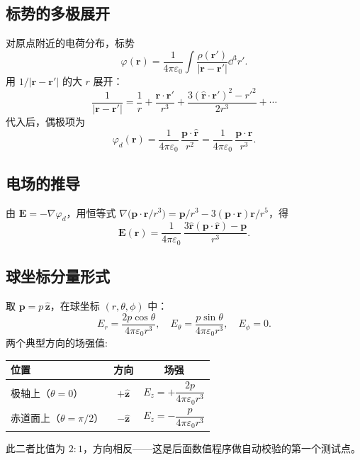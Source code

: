 \documentclass[11pt,a4paper]{article}
\newcommand{\epso}{\varepsilon_{0}}
\newcommand{\rhat}{\hat{\bm r}}
\newcommand{\pvec}{\bm p}
\newcommand{\Evec}{\bm E}
\newcommand{\rvec}{\bm r}
\begin{document}
\subsection{标势的多极展开}
对原点附近的电荷分布，标势
\begin{equation}
    \varphi(\rvec) = \frac{1}{4\pi\epso}\int\frac{\rho(\rvec')}{|\rvec-\rvec'|}\dd^{3}r'.
\end{equation}
用 $1/|\rvec-\rvec'|$ 的大 $r$ 展开：
\begin{equation}
    \frac{1}{|\rvec-\rvec'|} = \frac{1}{r} + \frac{\rvec\cdot\rvec'}{r^{3}}
                              + \frac{3(\rhat\cdot\rvec')^{2}-r'^{2}}{2r^{3}} + \cdots
\end{equation}
代入后，偶极项为
\begin{equation}
    \boxed{\,\varphi_{d}(\rvec) = \frac{1}{4\pi\epso}\,\frac{\pvec\cdot\rhat}{r^{2}}
                               = \frac{1}{4\pi\epso}\,\frac{\pvec\cdot\rvec}{r^{3}}.\,}
    \label{eq:dipole-phi}
\end{equation}

\subsection{电场的推导}
由 $\Evec=-\nabla\varphi_{d}$，用恒等式
$\nabla\!\bigl(\pvec\cdot\rvec/r^{3}\bigr)
   =\pvec/r^{3}-3(\pvec\cdot\rvec)\rvec/r^{5}$，得
\begin{equation}
    \boxed{\;
    \Evec(\rvec)=\frac{1}{4\pi\epso}\,
                \frac{3\rhat(\pvec\cdot\rhat)-\pvec}{r^{3}}.
    \;}
    \label{eq:E-dipole}
\end{equation}

\subsection{球坐标分量形式}
取 $\pvec=p\,\hat{\bm z}$，在球坐标 $(r,\theta,\phi)$ 中：
\begin{equation}
    E_{r}=\frac{2p\cos\theta}{4\pi\epso r^{3}},\quad
    E_{\theta}=\frac{p\sin\theta}{4\pi\epso r^{3}},\quad
    E_{\phi}=0.
\end{equation}
两个典型方向的场强值:
\begin{center}
\begin{tabular}{@{}lcc@{}}\toprule
位置 & 方向 & 场强 \\ \midrule
极轴上（$\theta=0$）   & $+\hat{\bm z}$ & $E_z = +\dfrac{2p}{4\pi\epso r^{3}}$ \\[6pt]
赤道面上（$\theta=\pi/2$） & $-\hat{\bm z}$ & $E_z = -\dfrac{p}{4\pi\epso r^{3}}$ \\ \bottomrule
\end{tabular}
\end{center}
此二者比值为 $2:1$，方向相反——这是后面数值程序做自动校验的第一个测试点。
\end{document}
